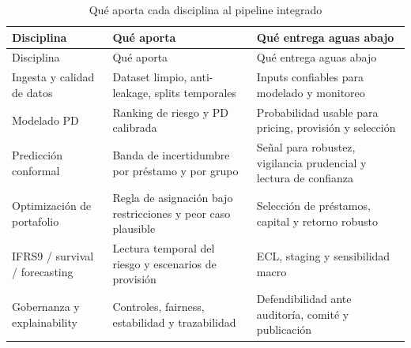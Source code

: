 \documentclass[
  spanish,
  11pt,
  letterpaper,
]{scrbook}
\theoremstyle{plain}
\theoremstyle{remark}
\begin{document}
\begin{longtable}[]{@{}
  >{\raggedright\arraybackslash}p{}
  >{\raggedright\arraybackslash}p{}
  >{\raggedright\arraybackslash}p{}@{}}
\caption{Qué aporta cada disciplina al pipeline
integrado}\label{tbl-discipline-handshake}\tabularnewline
\toprule\noalign{}
\begin{minipage}[b]{\linewidth}\raggedright
Disciplina
\end{minipage} & \begin{minipage}[b]{\linewidth}\raggedright
Qué aporta
\end{minipage} & \begin{minipage}[b]{\linewidth}\raggedright
Qué entrega aguas abajo
\end{minipage} \\
\midrule\noalign{}
\endfirsthead
\toprule\noalign{}
\begin{minipage}[b]{\linewidth}\raggedright
Disciplina
\end{minipage} & \begin{minipage}[b]{\linewidth}\raggedright
Qué aporta
\end{minipage} & \begin{minipage}[b]{\linewidth}\raggedright
Qué entrega aguas abajo
\end{minipage} \\
\midrule\noalign{}
\endhead
\bottomrule\noalign{}
\endlastfoot
Ingesta y calidad de datos & Dataset limpio, anti-leakage, splits
temporales & Inputs confiables para modelado y monitoreo \\
Modelado PD & Ranking de riesgo y PD calibrada & Probabilidad usable
para pricing, provisión y selección \\
Predicción conformal & Banda de incertidumbre por préstamo y por grupo &
Señal para robustez, vigilancia prudencial y lectura de confianza \\
Optimización de portafolio & Regla de asignación bajo restricciones y
peor caso plausible & Selección de préstamos, capital y retorno
robusto \\
IFRS9 / survival / forecasting & Lectura temporal del riesgo y
escenarios de provisión & ECL, staging y sensibilidad macro \\
Gobernanza y explainability & Controles, fairness, estabilidad y
trazabilidad & Defendibilidad ante auditoría, comité y publicación \\
\end{longtable}
\end{document}
